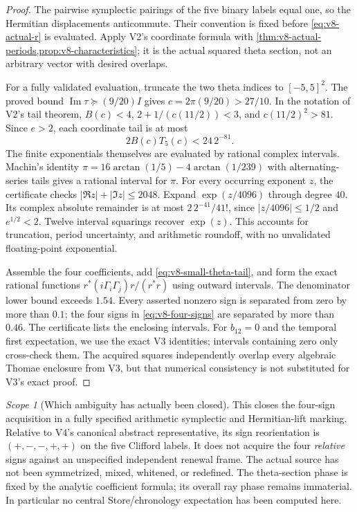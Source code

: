 \documentclass[11pt]{article}
\theoremstyle{definition}
\theoremstyle{remark}
\newtheorem{scope}[scope]{Scope}
\begin{document}
\begin{proof}
The pairwise symplectic pairings of the five binary labels equal one, so the
Hermitian displacements anticommute. Their convention is fixed before
\eqref{eq:v8-actual-r} is evaluated. Apply V2's coordinate formula with
\cref{thm:v8-actual-periods,prop:v8-characteristics}; it is the actual
squared theta section, not an arbitrary vector with desired overlaps.

For a fully validated evaluation, truncate the two theta indices to
$[-5,5]^2$. The proved bound $\operatorname{Im}\tau\succeq(9/20)I$
gives $c=2\pi(9/20)>27/10$. In the notation of V2's tail theorem,
$B(c)<4$, $2+1/(c(11/2))<3$, and $c(11/2)^2>81$. Since $e>2$, each
coordinate tail is at most
\begin{equation}
 2B(c)T_5(c)<24\,2^{-81}.
 \label{eq:v8-small-theta-tail}
\end{equation}
The finite exponentials themselves are evaluated by rational complex
intervals. Machin's identity
$\pi=16\arctan(1/5)-4\arctan(1/239)$ with alternating-series tails gives
a rational interval for $\pi$. For every occurring exponent $z$, the
certificate checks $|\Re z|+|\Im z|\le2048$. Expand
$\exp(z/4096)$ through degree $40$. Its complex absolute remainder is
at most $2\,2^{-41}/41!$, since $|z/4096|\le1/2$ and $e^{1/2}<2$.
Twelve interval squarings recover $\exp(z)$. This accounts for truncation,
period uncertainty, and arithmetic roundoff, with no unvalidated
floating-point exponential.

Assemble the four coefficients, add \eqref{eq:v8-small-theta-tail}, and
form the exact rational functions $r^*(i\Gamma_i\Gamma_j)r/(r^*r)$
using outward intervals. The denominator lower bound exceeds $1.54$.
Every asserted nonzero sign is separated from zero by more than $0.1$;
the four signs in \eqref{eq:v8-four-signs} are separated by more than
$0.46$. The certificate lists the enclosing intervals. For $b_{12}=0$
and the temporal first expectation, we use the exact V3 identities;
intervals containing zero only cross-check them. The acquired squares
independently overlap every algebraic Thomae enclosure from V3, but that
numerical consistency is not substituted for V3's exact proof.
\end{proof}

\begin{scope}[Which ambiguity has actually been closed]
This closes the four-sign acquisition in a fully specified arithmetic
symplectic and Hermitian-lift marking. Relative to V4's canonical abstract
representative, its sign reorientation is $(+,-,-,+,+)$ on the five
Clifford labels. It does not acquire the four \emph{relative}
signs against an unspecified independent renewal frame. The actual source
has not been symmetrized, mixed, whitened, or redefined. The theta-section
phase is fixed by the analytic coefficient formula; its overall ray phase
remains immaterial. In particular no central Store/chronology expectation
has been computed here.
\end{scope}
\end{document}
